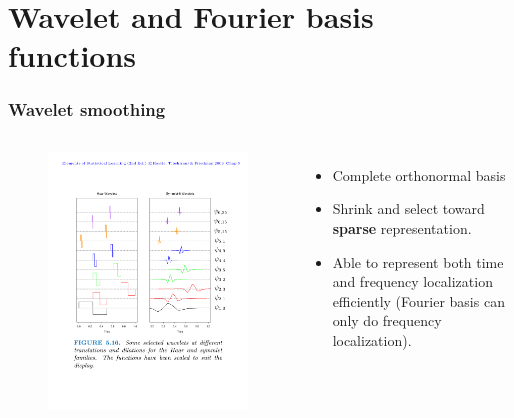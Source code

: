 \documentclass[aspectratio=169]{beamer}
\begin{document}
\section{Wavelet and Fourier basis functions}


\begin{frame}
\frametitle{Wavelet smoothing}
\begin{columns}
\begin{figure}
    \centering
    \includegraphics[width=\textwidth]{figures/wavelets.pdf}
\end{figure}
    \begin{itemize}
        \item Complete orthonormal basis
        \item Shrink and select toward \textbf{sparse} representation.
        \item Able to represent both time and frequency localization efficiently (Fourier basis can only do frequency localization).
    \end{itemize}
\end{columns}
\end{frame} 
\end{document}
